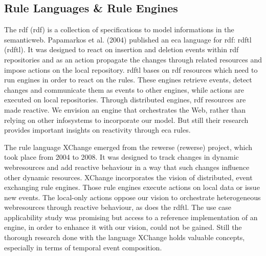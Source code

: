 \subsection{Rule Languages \& Rule Engines}
The \textrm{\acrlong{rdf} (\acrshort{rdf})} is a collection of specifications to model informations in the \textrm{\gls{semanticweb}}.
Papamarkos et al. (2004) published an \textrm{\acrshort{eca}} language for \textrm{\acrshort{rdf}}: \textrm{\acrlong{rdftl} (\acrshort{rdftl})}.
It was designed to react on insertion and deletion events within \textrm{\acrshort{rdf}} repositories and as an action propagate the changes through related resources and impose actions on the local repository. %
\textrm{\acrshort{rdftl}} bases on \textrm{\acrshort{rdf}} resources which need to run engines in order to react on the rules.
These engines retrieve events, detect changes and communicate them as events to other engines, while actions are executed on local repositories.
Through distributed engines, \textrm{\acrshort{rdf}} resources are made reactive.
We envision an engine that orchestrates the Web, rather than relying on other \textrm{\glspl{infosystem}} to incorporate our model.
But still their research provides important insights on reactivity through \textrm{\acrshort{eca}} rules.

The rule language \textrm{XChange}\cite{2005-Patranjan-TLE.pdf} emerged from the \textrm{\acrlong{rewerse} (\acrshort{rewerse})} project\cite{wwwRewerse}, which took place from 2004 to 2008. 
It was designed to track changes in dynamic \textrm{\glspl{webresource}} and add reactive behaviour in a way that such changes influence other dynamic resources.
\textrm{XChange} incorporates the vision of distributed, event exchanging rule engines.
Those rule engines execute actions on local data or issue new events.
The local-only actions oppose our vision to orchestrate heterogeneous \glspl{webresource} through reactive behaviour, as does the \textrm{\acrshort{rdftl}}.
The use case applicability study was promising but access to a reference implementation of an engine, in order to enhance it with our vision, could not be gained. %
Still the thorough research done with the language \textrm{XChange} holds valuable concepts, especially in terms of temporal event composition.

